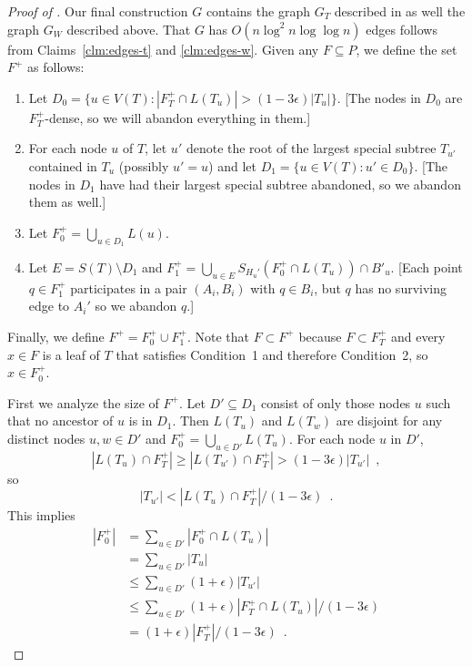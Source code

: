 \documentclass{patmorin}
\begin{document}
\begin{proof}[Proof of ]
  Our final construction $G$ contains the graph $G_T$ described in
   as well the graph $G_W$ described above.  That $G$
  has $O(n\log^2 n\log\log n)$ edges follows from Claims~\ref{clm:edges-t}
  and \ref{clm:edges-w}.  Given any $F\subseteq P$, we define the set $F^+$
  as follows:
  \begin{enumerate}
     \item Let $D_0=\{u\in V(T): |F^+_T\cap L(T_u)|>(1-3\epsilon)|T_u|\}$.
      [The nodes in $D_0$ are $F^+_T$-dense, so we will abandon
       everything in them.]

     \item For each node $u$ of $T$, let $u'$ denote the root of the largest
      special subtree $T_{u'}$ contained in $T_u$ (possibly $u'=u$) and 
      let $D_1=\{u\in V(T): u' \in D_0\}$. 
      [The nodes in $D_1$ have had their largest special subtree abandoned, so we abandon them as well.] 

     \item Let $F^+_0 = \bigcup_{u\in D_1} L(u)$.
     \item Let $E=S(T)\setminus D_1$ and $F_1^+=\bigcup_{u\in E}
       S_{H_u'}(F^+_0\cap L(T_u))\cap B'_u$. [Each point $q\in F^+_1$ participates
       in a pair $(A_i,B_i)$ with $q\in B_i$, but $q$ has no surviving
       edge to $A_i'$ so we abandon $q$.]
  \end{enumerate}
  Finally, we define $F^+=F^+_0\cup F^+_1$.  Note that $F\subset F^+$
  because $F\subset F^+_T$ and every $x\in F$ is a leaf of $T$ that
  satisfies Condition~1 and therefore Condition~2, so $x\in F^+_0$.

  First we analyze the size of $F^+$.  Let $D'\subseteq D_1$ consist of only those nodes $u$
  such that no ancestor of $u$ is in $D_1$.  Then $L(T_u)$ and $L(T_w)$ are
  disjoint for any distinct nodes $u,w\in D'$ and $F^+_0=\bigcup_{u\in
  D'} L(T_u)$.  
  For each node $u$ in $D'$, 
  \[
      |L(T_u)\cap F^+_T| \ge |L(T_{u'})\cap F^+_T| > (1-3\epsilon)|T_{u'}| 
        \enspace ,
  \]
  so
  \[
      |T_{u'}| < |L(T_u)\cap F^+_T|/ (1-3\epsilon) \enspace .
  \]
  This implies
  \begin{align*}
     |F^+_0| & = \sum_{u\in D'} |F^+_0\cap L(T_u)| \\
             & = \sum_{u\in D'} |T_u| \\
             & \le \sum_{u\in D'} (1+\epsilon)|T_{u'}| \\
             & \le \sum_{u\in D'} (1+\epsilon)|F^+_T\cap L(T_u)|/(1-3\epsilon) \\
             & = (1+\epsilon)|F^+_T|/(1-3\epsilon) \enspace .
  \end{align*}


\end{proof}
\end{document}
